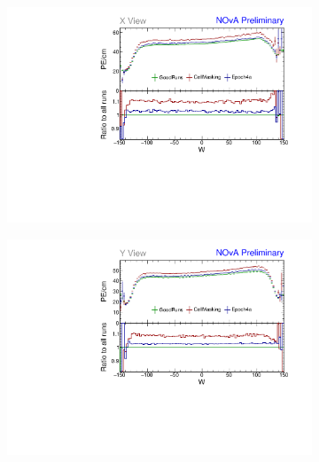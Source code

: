 \begin{figure}[!hbtp]
\centering
\begin{subfigure}[b]{0.495\textwidth}
\centering
\includegraphics[width=\textwidth]{Plots/TBCalibration/Attenprofs_P4Data_WPE_corr_xy_X_Combined.pdf}
\end{subfigure}
\begin{subfigure}[b]{0.495\textwidth}
\centering
\includegraphics[width=\textwidth]{Plots/TBCalibration/Attenprofs_P4Data_WPE_corr_xy_Y_Combined.pdf}
\end{subfigure}
\begin{subfigure}[b]{0.495\textwidth}
\centering

\end{subfigure}
\end{figure}
